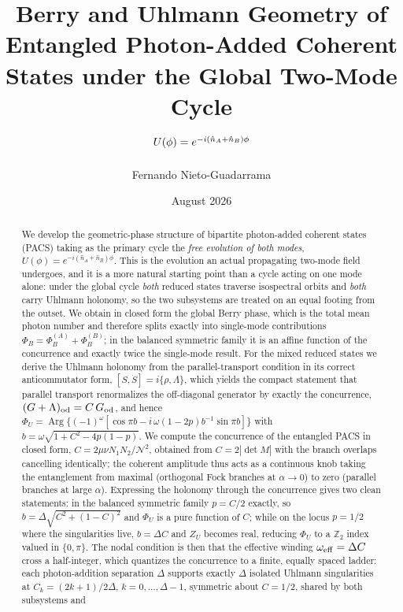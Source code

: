 \documentclass[11pt]{article}
\title{\textbf{Berry and Uhlmann Geometry of Entangled Photon-Added
Coherent States under the Global Two-Mode Cycle}\\[6pt]
\large $U(\phi)=e^{-i(\nop_A+\nop_B)\phi}$}
\author{Fernando Nieto-Guadarrama}
\date{August 2026}
\newcommand{\Arg}{\operatorname{Arg}}
\newcommand{\nop}{\hat n}
\begin{document}
\maketitle

\begin{abstract}
\noindent
We develop the geometric-phase structure of bipartite photon-added coherent
states (PACS) taking as the primary cycle the \emph{free evolution of both
modes}, $U(\phi)=e^{-i(\nop_A+\nop_B)\phi}$. This is the evolution an actual
propagating two-mode field undergoes, and it is a more natural starting point
than a cycle acting on one mode alone: under the global cycle \emph{both}
reduced states traverse isospectral orbits and \emph{both} carry Uhlmann
holonomy, so the two subsystems are treated on an equal footing from the
outset. We obtain in closed form the global Berry phase, which is the total
mean photon number and therefore splits exactly into single-mode contributions
$\Phi_B=\Phi_B^{(A)}+\Phi_B^{(B)}$; in the balanced symmetric family it is an
affine function of the concurrence and exactly twice the single-mode result.
For the mixed reduced states we derive the Uhlmann holonomy from the
parallel-transport condition in its correct anticommutator form,
$[S,\dot S]=i\{\rho,\Lambda\}$, which yields the compact statement that
parallel transport renormalizes the off-diagonal generator by exactly the
concurrence, $(G+\Lambda)_{\rm od}=C\,G_{\rm od}$, and hence
$\Phi_U=\Arg\{(-1)^\omega[\cos\pi b-i\,\omega(1-2p)b^{-1}\sin\pi b]\}$ with
$b=\omega\sqrt{1+C^2-4p(1-p)}$. We compute the concurrence of the entangled
PACS in closed form, $C=2\mu\nu N_1N_2/\mathcal N^2$, obtained from
$C=2|\det M|$ with the branch overlaps cancelling identically; the coherent
amplitude thus acts as a continuous knob taking the entanglement from maximal
(orthogonal Fock branches at $\alpha\to0$) to zero (parallel branches at large
$\alpha$). Expressing the holonomy through the concurrence gives two clean
statements: in the balanced symmetric family $p=C/2$ exactly, so
$b=\Delta\sqrt{C^2+(1-C)^2}$ and $\Phi_U$ is a pure function of $C$; while on
the locus $p=1/2$ where the singularities live, $b=\Delta C$ and $Z_U$ becomes
real, reducing $\Phi_U$ to a $\mathbb{Z}_2$ index valued in $\{0,\pi\}$. The
nodal condition is then that the effective winding $\omega_{\rm eff}=\Delta C$
cross a half-integer, which quantizes the concurrence to a finite, equally
spaced ladder: each photon-addition separation $\Delta$ supports exactly
$\Delta$ isolated Uhlmann singularities at $C_k=(2k+1)/2\Delta$,
$k=0,\dots,\Delta-1$, symmetric about $C=1/2$, shared by both subsystems and

\end{abstract}
\end{document}
